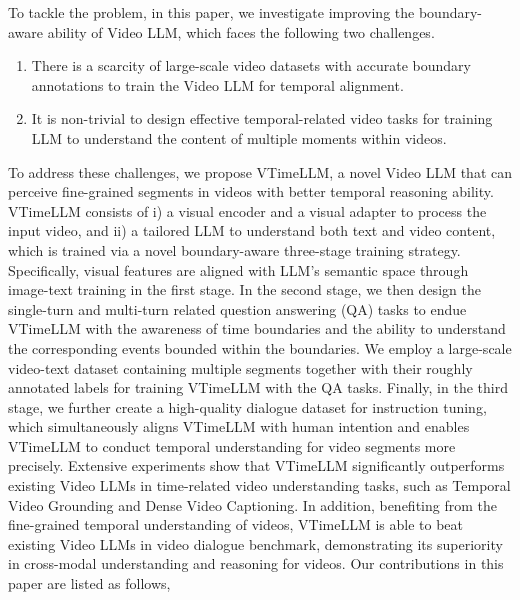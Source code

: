 \documentclass[10pt,twocolumn,letterpaper]{article}
\begin{document}
To tackle the problem, in this paper, we investigate improving the boundary-aware ability of Video LLM, which faces the following two challenges. 
\begin{enumerate}
    \item There is a scarcity of large-scale video datasets with accurate boundary annotations to train the Video LLM for temporal alignment.
    \item It is non-trivial to design effective temporal-related video tasks for training LLM to understand the content of multiple moments within videos.
\end{enumerate}
 


To address these challenges, we propose VTimeLLM, a novel Video LLM that can perceive fine-grained segments in videos with better temporal reasoning ability. 
VTimeLLM consists of i) a visual encoder and a visual adapter to process the input video, and ii) a tailored LLM to understand both text and video content, which is trained via a novel boundary-aware three-stage training strategy. 
Specifically, visual features are aligned with LLM's semantic space through image-text training in the first stage. In the second stage, we then design the single-turn and multi-turn related question answering (QA) tasks to 
endue VTimeLLM with the awareness of time boundaries and the ability to understand the corresponding events bounded within the boundaries. We employ a large-scale video-text dataset containing multiple segments together with 
their roughly annotated labels for training VTimeLLM with the QA tasks. Finally, in the third stage, we further create a high-quality dialogue dataset for instruction tuning, which simultaneously aligns VTimeLLM with human intention and enables VTimeLLM to conduct temporal understanding for video segments more precisely. 
Extensive experiments show that VTimeLLM significantly outperforms existing Video LLMs in time-related video understanding tasks, such as Temporal Video Grounding and Dense Video Captioning. 
In addition, benefiting from the fine-grained temporal understanding of videos, VTimeLLM is able to beat existing Video LLMs in video dialogue benchmark, demonstrating its superiority in cross-modal understanding and reasoning for videos. Our contributions in this paper are listed as follows,
\end{document}
